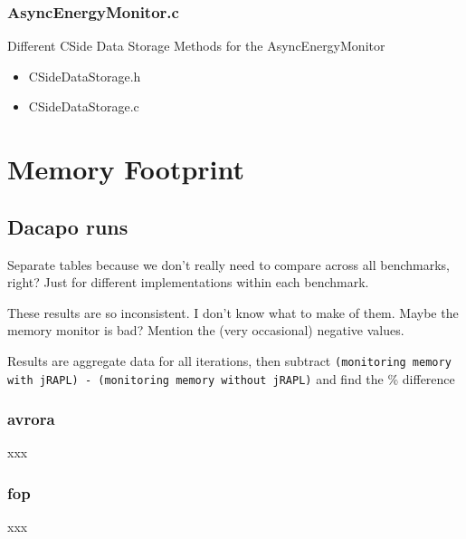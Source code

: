 \documentclass{article}
\begin{document}
    \subsubsection{AsyncEnergyMonitor.c}
        \begin{framed}
            \lstset{language=C}
            
        \end{framed}
    Different CSide Data Storage Methods for the AsyncEnergyMonitor
    \begin{itemize}
        \item CSideDataStorage.h
            \begin{framed}
                \lstset{language=C}
                
            \end{framed}
        \item CSideDataStorage.c
            \begin{framed}
                \lstset{language=C}
                
            \end{framed}
    \end{itemize}
    

\section{Memory Footprint}
\subsection{Dacapo runs}
Separate tables because we don't really need to compare across all benchmarks, right? Just for different implementations
within each benchmark.

These results are so inconsistent. I don't know what to make of them. Maybe the memory monitor is bad? Mention the (very
occasional) negative values.

Results are aggregate data for all iterations, then subtract \texttt{(monitoring memory with jRAPL) - 
(monitoring memory without jRAPL)} and find the \% difference

\subsubsection{avrora} xxx
    
\subsubsection{fop} xxx
    
\end{document}
